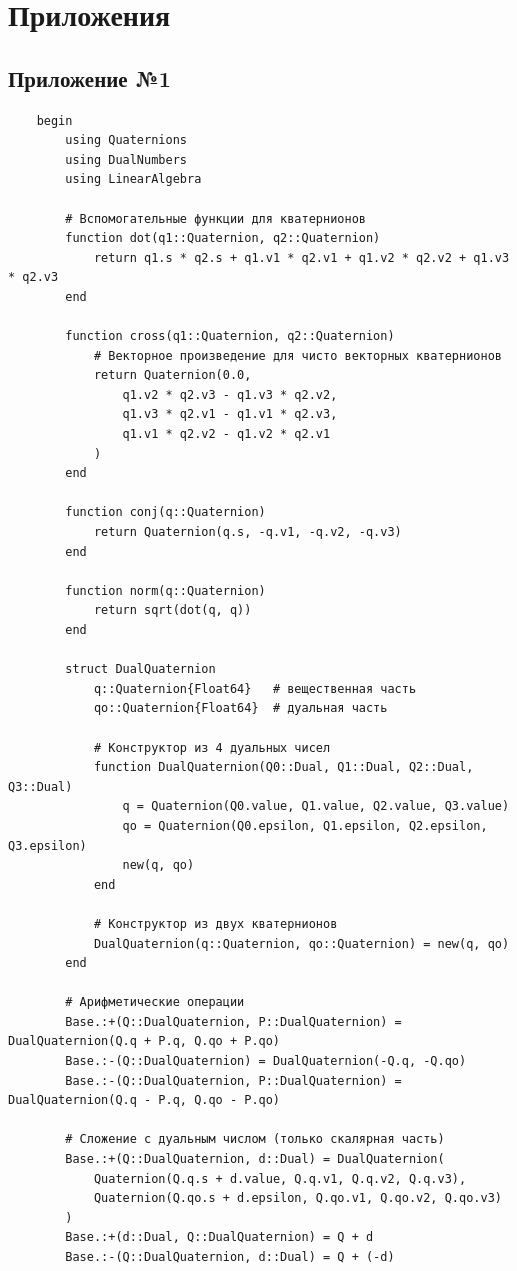 \chapter{Приложения}
\section{Приложение №1}

\begin{verbatim}
    begin
        using Quaternions
        using DualNumbers
        using LinearAlgebra
        
        # Вспомогательные функции для кватернионов
        function dot(q1::Quaternion, q2::Quaternion)
            return q1.s * q2.s + q1.v1 * q2.v1 + q1.v2 * q2.v2 + q1.v3 * q2.v3
        end
        
        function cross(q1::Quaternion, q2::Quaternion)
            # Векторное произведение для чисто векторных кватернионов
            return Quaternion(0.0, 
                q1.v2 * q2.v3 - q1.v3 * q2.v2,
                q1.v3 * q2.v1 - q1.v1 * q2.v3,
                q1.v1 * q2.v2 - q1.v2 * q2.v1
            )
        end
        
        function conj(q::Quaternion)
            return Quaternion(q.s, -q.v1, -q.v2, -q.v3)
        end
        
        function norm(q::Quaternion)
            return sqrt(dot(q, q))
        end
        
        struct DualQuaternion
            q::Quaternion{Float64}   # вещественная часть
            qo::Quaternion{Float64}  # дуальная часть
            
            # Конструктор из 4 дуальных чисел
            function DualQuaternion(Q0::Dual, Q1::Dual, Q2::Dual, Q3::Dual)
                q = Quaternion(Q0.value, Q1.value, Q2.value, Q3.value)
                qo = Quaternion(Q0.epsilon, Q1.epsilon, Q2.epsilon, Q3.epsilon)
                new(q, qo)
            end
            
            # Конструктор из двух кватернионов
            DualQuaternion(q::Quaternion, qo::Quaternion) = new(q, qo)
        end
        
        # Арифметические операции
        Base.:+(Q::DualQuaternion, P::DualQuaternion) = DualQuaternion(Q.q + P.q, Q.qo + P.qo)
        Base.:-(Q::DualQuaternion) = DualQuaternion(-Q.q, -Q.qo)
        Base.:-(Q::DualQuaternion, P::DualQuaternion) = DualQuaternion(Q.q - P.q, Q.qo - P.qo)
        
        # Сложение с дуальным числом (только скалярная часть)
        Base.:+(Q::DualQuaternion, d::Dual) = DualQuaternion(
            Quaternion(Q.q.s + d.value, Q.q.v1, Q.q.v2, Q.q.v3),
            Quaternion(Q.qo.s + d.epsilon, Q.qo.v1, Q.qo.v2, Q.qo.v3)
        )
        Base.:+(d::Dual, Q::DualQuaternion) = Q + d
        Base.:-(Q::DualQuaternion, d::Dual) = Q + (-d)

\end{verbatim}
